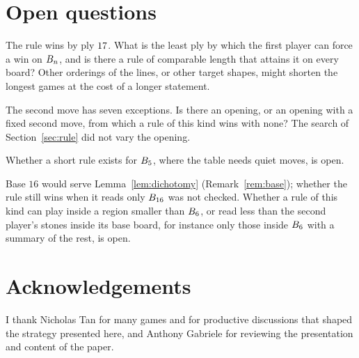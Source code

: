 \documentclass[11pt]{amsart}
\theoremstyle{definition}
\theoremstyle{remark}
\begin{document}
\section{Open questions}

The rule wins by ply $17$. What is the least ply by which the
first player can force a win on $B_n$, and is there a rule of
comparable length that attains it on every board? Other orderings of
the lines, or other target shapes, might shorten the longest games at
the cost of a longer statement.

The second move has seven exceptions. Is there an opening, or an
opening with a fixed second move, from which a rule of this kind wins
with none? The search of Section~\ref{sec:rule} did not vary the
opening.

Whether a short rule exists for $B_5$, where the table needs quiet
moves, is open.

Base $16$ would serve Lemma~\ref{lem:dichotomy}
(Remark~\ref{rem:base}); whether the rule still wins when it reads only
$B_{16}$ was not checked. Whether a rule of this kind can play
inside a region smaller than $B_6$, or read less than the second
player's stones inside its base board, for instance only those inside
$B_6$ with a summary of the rest, is open.

\section*{Acknowledgements}

I thank Nicholas Tan for many games and for productive discussions that
shaped the strategy presented here, and Anthony Gabriele for reviewing
the presentation and content of the paper.



\end{document}

